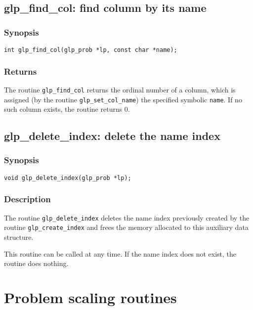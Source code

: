 \subsection{glp\_find\_col: find column by its name}

\subsubsection*{Synopsis}

\begin{verbatim}
int glp_find_col(glp_prob *lp, const char *name);
\end{verbatim}

\subsubsection*{Returns}

The routine \verb|glp_find_col| returns the ordinal number of a column,
which is assigned (by the routine \verb|glp_set_col_name|) the specified
symbolic \verb|name|. If no such column exists, the routine returns 0.

\subsection{glp\_delete\_index: delete the name index}

\subsubsection*{Synopsis}

\begin{verbatim}
void glp_delete_index(glp_prob *lp);
\end{verbatim}

\subsubsection*{Description}

The routine \verb|glp_delete_index| deletes the name index previously
created by the routine \verb|glp_create_index| and frees the memory
allocated to this auxiliary data structure.

This routine can be called at any time. If the name index does not
exist, the routine does nothing.


\newpage

\section{Problem scaling routines}


